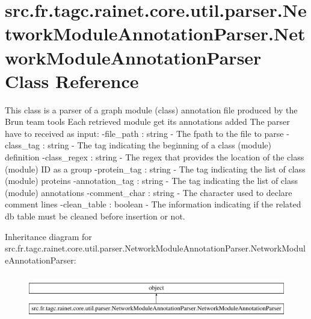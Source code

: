 \hypertarget{classsrc_1_1fr_1_1tagc_1_1rainet_1_1core_1_1util_1_1parser_1_1NetworkModuleAnnotationParser_1_1NetworkModuleAnnotationParser}{\section{src.\-fr.\-tagc.\-rainet.\-core.\-util.\-parser.\-Network\-Module\-Annotation\-Parser.\-Network\-Module\-Annotation\-Parser Class Reference}
\label{classsrc_1_1fr_1_1tagc_1_1rainet_1_1core_1_1util_1_1parser_1_1NetworkModuleAnnotationParser_1_1NetworkModuleAnnotationParser}
}


This class is a parser of a graph module (class) annotation file produced by the Brun team tools Each retrieved module get its annotations added The parser have to received as input\-: -\/file\-\_\-path \-: string -\/ The fpath to the file to parse -\/class\-\_\-tag \-: string -\/ The tag indicating the beginning of a class (module) definition -\/class\-\_\-regex \-: string -\/ The regex that provides the location of the class (module) I\-D as a group -\/protein\-\_\-tag \-: string -\/ The tag indicating the list of class (module) proteins -\/annotation\-\_\-tag \-: string -\/ The tag indicating the list of class (module) annotations -\/comment\-\_\-char \-: string -\/ The character used to declare comment lines -\/clean\-\_\-table \-: boolean -\/ The information indicating if the related db table must be cleaned before insertion or not.  


Inheritance diagram for src.\-fr.\-tagc.\-rainet.\-core.\-util.\-parser.\-Network\-Module\-Annotation\-Parser.\-Network\-Module\-Annotation\-Parser\-:\begin{figure}[H]
\begin{center}
\leavevmode
\includegraphics[height=1.911263cm]{classsrc_1_1fr_1_1tagc_1_1rainet_1_1core_1_1util_1_1parser_1_1NetworkModuleAnnotationParser_1_1NetworkModuleAnnotationParser}
\end{center}
\end{figure}
